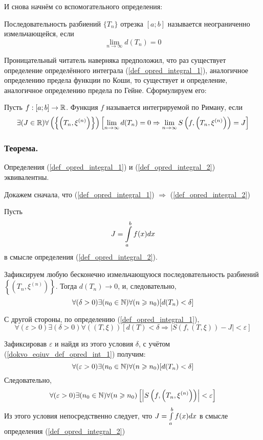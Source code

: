 И снова начнём со вспомогательного определения:

\opred
Последовательность разбиений $\{T_n\}$ отрезка $[a;b]$ называется неограниченно измельчающейся, если 
$$\lim_{n\to\infty}d(T_n) = 0$$

Проницательный читатель наверняка предположил, что раз существует определение определённого интеграла (\ref{def_opred_integral_1}), аналогичное определению предела функции по Коши, то существует и определение, аналогичное определению предела по Гейне. Сформулируем его:

\opred
Пусть $f:[a;b]\to \mathbb{R}$. Функция $f$ называется интегрируемой по Риману, если
\begin{equation}\label{def_opred_integral_2}
\exists(J\in\mathbb{R})\forall\left(\left\{\left(T_n,\xi^{(n)}\right)\right\}\right)
\left[\lim_{n\to\infty}d(T_n) = 0 \Rightarrow \lim_{n\to\infty}S\left(f,\left(T_n,\xi^{(n)}\right)\right)=J\right]
\end{equation}

\subsubsection{Теорема.}
Определения (\ref{def_opred_integral_1}) и (\ref{def_opred_integral_2}) эквивалентны.

Докажем сначала, что (\ref{def_opred_integral_1}) $\Rightarrow$ (\ref{def_opred_integral_2})

\dokvo
Пусть $$J=\int\limits_a^b f(x) dx $$ в смысле определения (\ref{def_opred_integral_2}).

Зафиксируем любую бесконечно измельчающуюся последовательность разбиений $\left\{\left( T_n, \xi^{(n)}\right)\right\}$. Тогда $d(T_n)\to 0$, и, следовательно,
\begin{equation}\label{dokvo_eqiuv_def_opred_int_1}
\forall(\delta>0)\exists(n_0\in\mathbb{N})\forall(n\geqslant n_0)[d(T_n)<\delta]
\end{equation}

С другой стороны, по определению (\ref{def_opred_integral_1}),
$$
\forall(\varepsilon>0)\exists(\delta>0)\forall((T,\xi))[d(T)<\delta \Rightarrow |S(f,(T,\xi))-J|<\varepsilon]
$$

Зафиксировав $\varepsilon$ и найдя из этого условия $\delta$, с учётом (\ref{dokvo_eqiuv_def_opred_int_1}) получим:
$$
\forall(\varepsilon>0)\exists(n_0\in\mathbb{N})\forall(n\geqslant n_0)[d(T_n)<\delta]
$$
Следовательно,
$$
\forall(\varepsilon>0)\exists(n_0\in\mathbb{N})\forall(n\geqslant n_0)\left[\left|S\left(f,\left(T_n,\xi^{(n)}\right)\right)\right|<\varepsilon\right]
$$
Из этого условия непосредственно следует, что $J=\int\limits_a^b f(x) dx$ в смысле определения (\ref{def_opred_integral_2})

